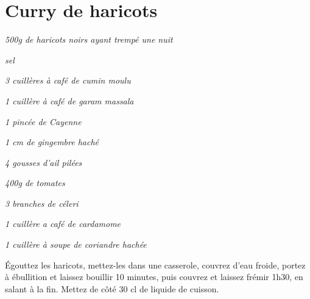 \documentclass[10pt,a4paper]{report}
\begin{document}
    \newpage

    \section{Curry de haricots}

    \begin{multicols}{2}
        \parbox[1cm]{\textwidth}{
            \begin{description}
                \item \textit{500g de haricots noirs ayant trempé une nuit}
                \item \textit{sel}
                \item \textit{3 cuillères à café de cumin moulu}
                \item \textit{1 cuillère à café de garam massala}
                \item \textit{1 pincée de Cayenne}
                \item \textit{1 cm de gingembre haché}
                \item \textit{4 gousses d'ail pilées}
                \item \textit{400g de tomates}
                \item \textit{3 branches de céleri}
                \item \textit{1 cuillère a café de cardamome}
                \item \textit{1 cuillère à soupe de coriandre hachée}
            \end{description}
        }
        \columnbreak

        Égouttez les haricots, mettez-les dans une casserole, couvrez d'eau froide, portez à ébullition et laissez bouillir 10 minutes, puis couvrez et laissez frémir 1h30, en salant à la fin. Mettez de côté 30 cl de liquide de cuisson.
        \newline


\end{multicols}
\end{document}

